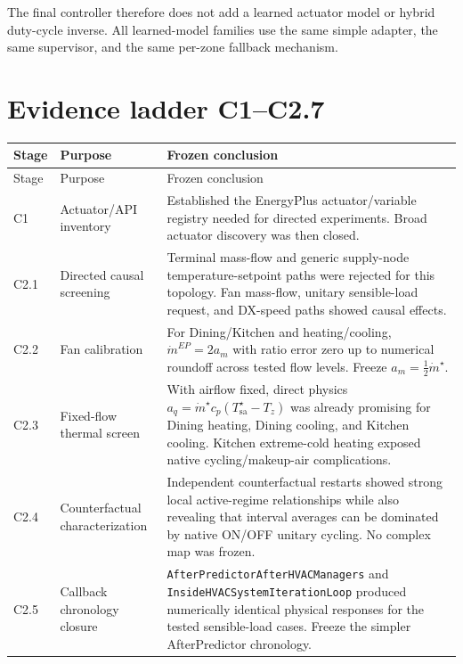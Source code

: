\documentclass[11pt]{article}
\newcommand{\mdot}{\dot m}
\newcommand{\Tsa}{T_{\mathrm{sa}}}
\newcommand{\Tz}{T_z}
\begin{document}
The final controller therefore does not add a learned actuator model or hybrid
duty-cycle inverse.  All learned-model families use the same simple adapter,
the same supervisor, and the same per-zone fallback mechanism.

\section{Evidence ladder C1--C2.7}

\begin{longtable}{p{}p{}p{}}
\toprule
Stage & Purpose & Frozen conclusion \\
\midrule
\endfirsthead
\toprule
Stage & Purpose & Frozen conclusion \\
\midrule
\endhead

C1 &
Actuator/API inventory &
Established the EnergyPlus actuator/variable registry needed for directed
experiments.  Broad actuator discovery was then closed. \\

C2.1 &
Directed causal screening &
Terminal mass-flow and generic supply-node temperature-setpoint paths were
rejected for this topology.  Fan mass-flow, unitary sensible-load request, and
DX-speed paths showed causal effects. \\

C2.2 &
Fan calibration &
For Dining/Kitchen and heating/cooling,
$\mdot^{EP}=2a_m$ with ratio error zero up to numerical roundoff across tested
flow levels.  Freeze $a_m=\tfrac12\mdot^\star$. \\

C2.3 &
Fixed-flow thermal screen &
With airflow fixed, direct physics
$a_q=\mdot^\star c_p(\Tsa^\star-\Tz)$ was already promising for Dining heating,
Dining cooling, and Kitchen cooling.  Kitchen extreme-cold heating exposed
native cycling/makeup-air complications. \\

C2.4 &
Counterfactual characterization &
Independent counterfactual restarts showed strong local active-regime
relationships while also revealing that interval averages can be dominated by
native ON/OFF unitary cycling.  No complex map was frozen. \\

C2.5 &
Callback chronology closure &
\texttt{AfterPredictorAfterHVACManagers} and
\texttt{InsideHVACSystemIterationLoop} produced numerically identical physical
responses for the tested sensible-load cases.  Freeze the simpler
AfterPredictor chronology. \\


\end{longtable}
\end{document}
